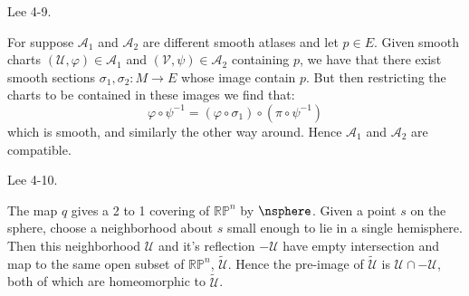     \begin{problem}
        Lee 4-9.
    \end{problem}
    \begin{solution}
        For suppose $\mathcal{A}_{1}$ and $\mathcal{A}_{2}$ are different
        smooth atlases and let $p\in{E}$. Given smooth charts
        $(\mathcal{U},\varphi)\in\mathcal{A}_{1}$ and
        $(\mathcal{V},\psi)\in\mathcal{A}_{2}$ containing $p$, we have that
        there exist smooth sections $\sigma_{1},\sigma_{2}:M\rightarrow{E}$
        whose image contain $p$. But then restricting the charts to be
        contained in these images we find that:
        \begin{equation}
            \varphi\circ\psi^{\minus{1}}=
            (\varphi\circ\sigma_{1})\circ(\pi\circ\psi^{\minus{1}})
        \end{equation}
        which is smooth, and similarly the other way around. Hence
        $\mathcal{A}_{1}$ and $\mathcal{A}_{2}$ are compatible.
    \end{solution}
    \begin{problem}
        Lee 4-10.
    \end{problem}
    \begin{solution}
        The map $q$ gives a 2 to 1 covering of $\mathbb{RP}^{n}$ by
        $\nsphere$. Given a point $s$ on the sphere, choose a neighborhood
        about $s$ small enough to lie in a single hemisphere. Then this
        neighborhood $\mathcal{U}$ and it's reflection $\minus\mathcal{U}$
        have empty intersection and map to the same open subset of
        $\mathbb{RP}^{n}$, $\tilde{\mathcal{U}}$. Hence the pre-image of
        $\tilde{\mathcal{U}}$ is $\mathcal{U}\cap\minus\mathcal{U}$, both
        of which are homeomorphic to $\tilde{\mathcal{U}}$.
    \end{solution}
